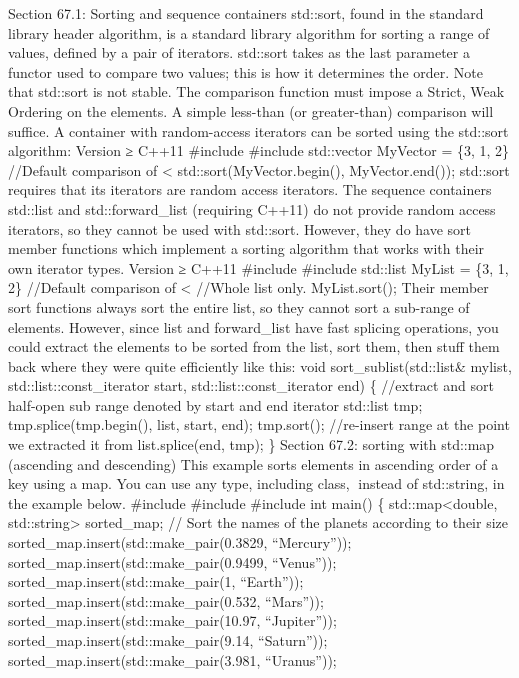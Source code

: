 Section 67.1: Sorting and sequence containers std::sort, found in the
standard library header algorithm, is a standard library algorithm for
sorting a range of values, deﬁned by a pair of iterators. std::sort
takes as the last parameter a functor used to compare two values; this
is how it determines the order. Note that std::sort is not stable. The
comparison function must impose a Strict, Weak Ordering on the elements.
A simple less-than (or greater-than) comparison will suﬃce. A container
with random-access iterators can be sorted using the std::sort
algorithm: Version ≥ C++11 \#include \#include std::vector MyVector =
\{3, 1, 2\} //Default comparison of \textless{}
std::sort(MyVector.begin(), MyVector.end()); std::sort requires that its
iterators are random access iterators. The sequence containers std::list
and std::forward\_list (requiring C++11) do not provide random access
iterators, so they cannot be used with std::sort. However, they do have
sort member functions which implement a sorting algorithm that works
with their own iterator types. Version ≥ C++11 \#include \#include
std::list MyList = \{3, 1, 2\} //Default comparison of \textless{}
//Whole list only. MyList.sort(); Their member sort functions always
sort the entire list, so they cannot sort a sub-range of elements.
However, since list and forward\_list have fast splicing operations, you
could extract the elements to be sorted from the list, sort them, then
stuﬀ them back where they were quite eﬃciently like this: void
sort\_sublist(std::list\& mylist, std::list::const\_iterator start,
std::list::const\_iterator end) \{ //extract and sort half-open sub
range denoted by start and end iterator std::list tmp;
tmp.splice(tmp.begin(), list, start, end); tmp.sort(); //re-insert range
at the point we extracted it from list.splice(end, tmp); \} Section
67.2: sorting with std::map (ascending and descending) This example
sorts elements in ascending order of a key using a map. You can use any
type, including class, instead of std::string, in the example below.
\#include \#include \#include int main() \{ std::map\textless double,
std::string\textgreater{} sorted\_map; // Sort the names of the planets
according to their size sorted\_map.insert(std::make\_pair(0.3829,
``Mercury'')); sorted\_map.insert(std::make\_pair(0.9499, ``Venus''));
sorted\_map.insert(std::make\_pair(1, ``Earth''));
sorted\_map.insert(std::make\_pair(0.532, ``Mars''));
sorted\_map.insert(std::make\_pair(10.97, ``Jupiter''));
sorted\_map.insert(std::make\_pair(9.14, ``Saturn''));
sorted\_map.insert(std::make\_pair(3.981, ``Uranus''));
